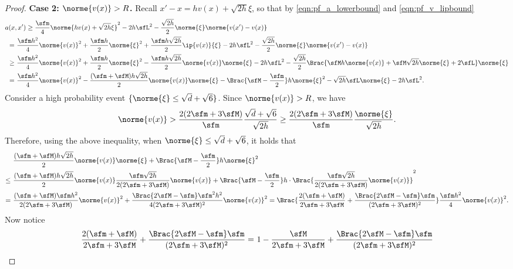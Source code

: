 \documentclass[11pt]{article}
\begin{document}
\begin{proof}
\noindent
{\bf Case 2: $\norme{v(x)} > R$.} 
Recall $ x' - x = h v(x) + \sqrt{2h} \xi $, so that by \eqref{eqn:pf_a_lowerbound} and \eqref{eqn:pf_v_lipbound}
\begin{equation}
\label{eqn:pf_a_case2}
\begin{split}
    a(x,&\,x') \ge \frac{\sfm}{4} \norme{ h v(x) + \sqrt{2h} \xi }^2 - 2 h \sfL^2 - \frac{\sqrt{2h}}{2} \norme{ \xi } \norme{v(x')-v(x)} \\
    =~& \frac{\sfm h^2}{4} \norme{v(x)}^2 + \frac{\sfm h}{2} \norme{\xi}^2 + \frac{\sfm h\sqrt{2h}}{2} \ip{v(x)}{\xi} - 2 h \sfL^2 - \frac{\sqrt{2h}}{2} \norme{ \xi } \norme{v(x')-v(x)} \\
    \ge~&\frac{\sfm h^2}{4} \norme{v(x)}^2 + \frac{\sfm h}{2} \norme{\xi}^2 - \frac{\sfm h\sqrt{2h}}{2} \norme{v(x)} \norme{\xi} - 2 h \sfL^2 - \frac{\sqrt{2h}}{2} \Brac{ \sfM h \norme{v(x)} + \sfM \sqrt{2h} \norme{\xi} + 2 \sfL } \norme{\xi} \\
    =~& \frac{\sfm h^2}{4} \norme{v(x)}^2 - \frac{(\sfm+\sfM) h\sqrt{2h}}{2} \norme{v(x)} \norme{\xi} - \Brac{ \sfM - \frac{\sfm}{2}  } h \norme{\xi}^2 - \sqrt{2h} \sfL \norme{\xi} - 2 h \sfL^2.
\end{split}
\end{equation}
%
Consider a high probability event $\{ \norme{\xi} \le \sqrt{d} + \sqrt{6} \}$.
Since $\norme{v(x)} > R$, we have 
\[
    \norme{v(x)} > \frac{2(2\sfm+3\sfM)}{\sfm} \frac{\sqrt{d}+\sqrt{6}}{\sqrt{2h}} \ge \frac{2(2\sfm+3\sfM)}{\sfm} \frac{\norme{\xi}}{\sqrt{2h}}. 
\]
Therefore, using the above inequality, when $\norme{\xi} \le \sqrt{d} + \sqrt{6}$, it holds that
\begin{align*}
    & \frac{(\sfm+\sfM) h\sqrt{2h}}{2} \norme{v(x)} \norme{\xi} + \Brac{ \sfM - \frac{\sfm}{2}  } h \norme{\xi}^2 \\
    \le~& \frac{(\sfm+\sfM) h\sqrt{2h}}{2} \norme{v(x)} \frac{\sfm\sqrt{2h}}{2(2\sfm+3\sfM)} \norme{v(x)} + \Brac{ \sfM - \frac{\sfm}{2}  } h \cdot \Brac{ \frac{\sfm\sqrt{2h}}{2(2\sfm+3\sfM)} \norme{v(x)} }^2 \\
    =~& \frac{ (\sfm+\sfM) \sfm h^2}{2(2\sfm+3\sfM)} \norme{v(x)}^2 + \frac{ \Brac{ 2 \sfM - \sfm } \sfm^2 h^2}{4(2\sfm+3\sfM)^2} \norme{v(x)}^2 = \Brac{ \frac{ 2(\sfm+\sfM) }{2\sfm+3\sfM} + \frac{ \Brac{ 2 \sfM - \sfm } \sfm }{(2\sfm+3\sfM)^2} } \frac{\sfm h^2}{4} \norme{v(x)}^2.
\end{align*}
Now notice
\begin{align*}
    \frac{ 2(\sfm+\sfM) }{2\sfm+3\sfM} + \frac{ \Brac{ 2 \sfM - \sfm } \sfm }{(2\sfm+3\sfM)^2} =~& 1 - \frac{ \sfM }{2\sfm+3\sfM} + \frac{ \Brac{ 2 \sfM - \sfm } \sfm }{(2\sfm+3\sfM)^2}  \\

\end{align*}
\end{proof}
\end{document}
